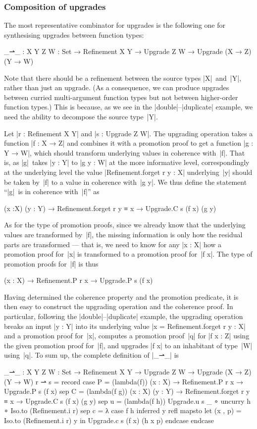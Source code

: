 \subsubsection{Composition of upgrades}
The most representative combinator for upgrades is the following one for synthesising upgrades between function types:
\begin{code}
_⇀_ :  {X Y Z W : Set} →
       Refinement X Y → Upgrade Z W → Upgrade (X → Z) (Y → W)
\end{code}
Note that there should be a refinement between the source types |X|~and~|Y|, rather than just an upgrade.
(As a consequence, we can produce upgrades between curried multi-argument function types but not between higher-order function types.)
This is because, as we see in the |double|--|duplicate| example, we need the ability to decompose the source type~|Y|.

Let |r : Refinement X Y| and |s : Upgrade Z W|.
The upgrading operation takes a function |f : X → Z| and combines it with a promotion proof to get a function |g : Y → W|, which should transform underlying values in coherence with~|f|.
That is, as |g|~takes |y : Y| to |g y : W| at the more informative level, correspondingly at the underlying level the value |Refinement.forget r y : X| underlying~|y| should be taken by~|f| to a value in coherence with~|g y|.
We thus define the statement ``|g|~is in coherence with~|f|'' as
\begin{code}
(x :X) (y : Y) → Refinement.forget r y ≡ x → Upgrade.C s (f x) (g y)
\end{code}
As for the type of promotion proofs, since we already know that the underlying values are transformed by~|f|, the missing information is only how the residual parts are transformed --- that is, we need to know for any |x : X| how a promotion proof for~|x| is transformed to a promotion proof for~|f x|.
The type of promotion proofs for~|f| is thus
\begin{code}
(x : X) → Refinement.P r x → Upgrade.P s (f x)
\end{code}
Having determined the coherence property and the promotion predicate, it is then easy to construct the upgrading operation and the coherence proof.
In particular, following the |double|--|duplicate| example, the upgrading operation breaks an input |y : Y| into its underlying value |x = Refinement.forget r y : X| and a promotion proof for~|x|, computes a promotion proof~|q| for |f x : Z| using the given promotion proof for~|f|, and upgrades |f x| to an inhabitant of type~|W| using~|q|.
To sum up, the complete definition of |_⇀_| is
\begin{code}
_⇀_ :  {X Y Z W : Set} →
       Refinement X Y → Upgrade Z W → Upgrade (X → Z) (Y → W)
r ⇀ s = record
  case   P  = (lambda(f)) (x : X) → Refinement.P r x → Upgrade.P s (f x)
  sep    C  = (lambda(f g))  (x : X) (y : Y) →
                             Refinement.forget r y ≡ x → Upgrade.C s (f x) (g y)
  sep    u  = (lambda(f h)) Upgrade.u s _ ∘ uncurry h ∘ Iso.to (Refinement.i r)
  sep    c  = λ case f h inferred y refl mapsto  let  (x , p) = Iso.to (Refinement.i r) y
                                                 in   Upgrade.c s (f x) (h x p) endcase endcase
\end{code}

